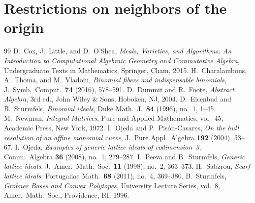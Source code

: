 \documentclass[10pt,a4paper]{amsart}
\begin{document}
\section{Restrictions on neighbors of the origin}
\label{sec:lambda}


\begin{thebibliography}{99}
 D.~Cox, J.~Little, and D.~O'Shea, \textit{Ideals, Varieties, and Algorithms: An Introduction to Computational Algebraic Geometry and Commutative Algebra}, Undergraduate Texts in Mathematics, Springer, Cham, 2015.
 H.~Charalambous, A.~Thoma, and M.~Vladoiu, \textit{Binomial fibers and indispensable binomials}, J.\ Symb.\ Comput.\ \textbf{74} (2016), 578--591.
 D.~Dummit and R.~Foote, \textit{Abstract Algebra}, 3rd ed., John Wiley \& Sons, Hoboken, NJ, 2004.
 D.~Eisenbud and B.~Sturmfels, \textit{Binomial ideals}, Duke Math.\ J.\ \textbf{84} (1996), no.~1, 1--45.
 M.~Newman, \textit{Integral Matrices}, Pure and Applied Mathematics, vol.~45, Academic Press, New York, 1972.
 I.~Ojeda and P.~Pis\'on-Casares, \textit{On the hull resolution of an affine monomial curve}, J.~Pure Appl.\ Algebra \textbf{192} (2004), 53--67.
 I.~Ojeda, \textit{Examples of generic lattice ideals of codimension~3}, Comm.\ Algebra \textbf{36} (2008), no.~1, 279--287.
 I.~Peeva and B.~Sturmfels, \textit{Generic lattice ideals}, J.~Amer.\ Math.\ Soc.\ \textbf{11} (1998), no.~2, 363--373.
 H.~Sabzrou, \textit{Scarf lattice ideals}, Portugaliae Math.\ \textbf{68} (2011), no.~4, 369--380.
 B.~Sturmfels, \textit{Gr\"obner Bases and Convex Polytopes}, University Lecture Series, vol.~8, Amer.\ Math.\ Soc., Providence, RI, 1996.
\end{thebibliography}
\end{document}
